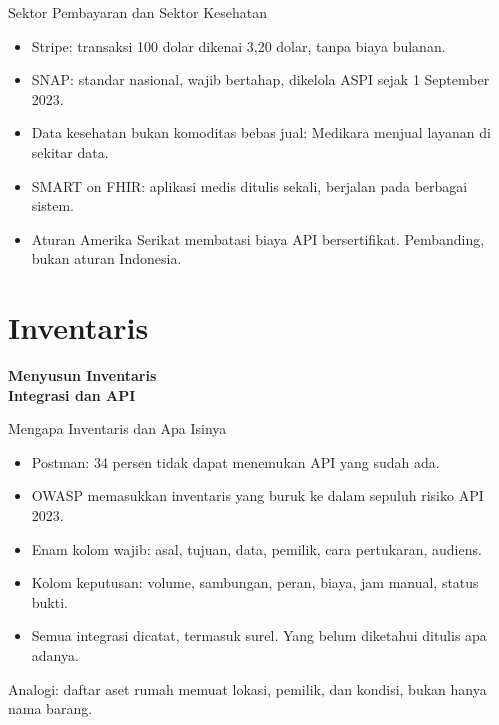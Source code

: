 \documentclass[aspectratio=169, table, 12pt]{beamer}
\begin{document}
\begin{frame}{{\Large Sektor Pembayaran dan Sektor Kesehatan}}
  \vspace{10pt}
  \begin{itemize}
    \item Stripe: transaksi 100 dolar dikenai 3,20 dolar, tanpa biaya bulanan.
    \item SNAP: standar nasional, wajib bertahap, dikelola ASPI sejak 1 September 2023.
    \item Data kesehatan bukan komoditas bebas jual: Medikara menjual layanan di sekitar data.
    \item SMART on FHIR: aplikasi medis ditulis sekali, berjalan pada berbagai sistem.
    \item Aturan Amerika Serikat membatasi biaya API bersertifikat. Pembanding, bukan aturan Indonesia.
  \end{itemize}
\end{frame}

\section{Inventaris}

\begin{frame}{\hfill}
  \centering
  \Huge{\textbf{Menyusun Inventaris\\Integrasi dan API}}
\end{frame}

\begin{frame}{{\Large Mengapa Inventaris dan Apa Isinya}}
  \vspace{10pt}
  \begin{itemize}
    \item Postman: 34 persen tidak dapat menemukan API yang sudah ada.
    \item OWASP memasukkan inventaris yang buruk ke dalam sepuluh risiko API 2023.
    \item Enam kolom wajib: asal, tujuan, data, pemilik, cara pertukaran, audiens.
    \item Kolom keputusan: volume, sambungan, peran, biaya, jam manual, status bukti.
    \item Semua integrasi dicatat, termasuk surel. Yang belum diketahui ditulis apa adanya.
  \end{itemize}
  \vspace{6pt}
  {\small Analogi: daftar aset rumah memuat lokasi, pemilik, dan kondisi, bukan hanya nama barang.}
\end{frame}
\end{document}
